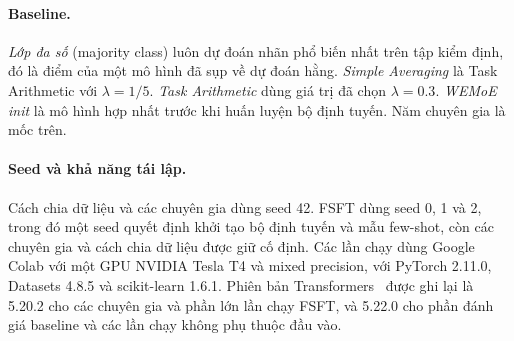 \paragraph{Baseline.} \emph{Lớp đa số} (majority class) luôn dự đoán nhãn phổ biến nhất trên tập kiểm định, đó là điểm của một mô hình đã sụp về dự đoán hằng. \emph{Simple Averaging} là Task Arithmetic với $\lambda=1/5$. \emph{Task Arithmetic} dùng giá trị đã chọn $\lambda=0.3$. \emph{WEMoE init} là mô hình hợp nhất trước khi huấn luyện bộ định tuyến. Năm chuyên gia là mốc trên.

\paragraph{Seed và khả năng tái lập.} Cách chia dữ liệu và các chuyên gia dùng seed 42. FSFT dùng seed 0, 1 và 2, trong đó một seed quyết định khởi tạo bộ định tuyến và mẫu few-shot, còn các chuyên gia và cách chia dữ liệu được giữ cố định. Các lần chạy dùng Google Colab với một GPU NVIDIA Tesla T4 và mixed precision, với PyTorch 2.11.0, Datasets 4.8.5 và scikit-learn 1.6.1. Phiên bản Transformers~\cite{wolf2020transformers} được ghi lại là 5.20.2 cho các chuyên gia và phần lớn lần chạy FSFT, và 5.22.0 cho phần đánh giá baseline và các lần chạy không phụ thuộc đầu vào.
